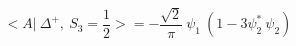 \begin{equation}
<A|~\Delta^{+},~ S_3=\frac{1}{2} >= - \frac{\sqrt{2}}{\pi} ~\psi_1~(1-3\psi_2^*~\psi_2)
\end{equation}

